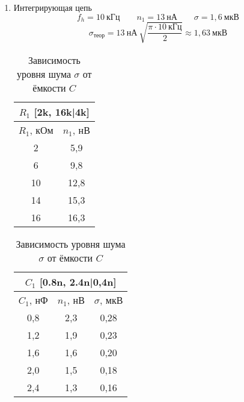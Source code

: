 \begin{enumerate}
	\item Интегрирующая цепь
	\[
		f_h = 10 \ кГц \quad \quad n_1 = 13 \ нА \quad \quad \sigma = 1,6 \ мкВ
	\]
	\[
		\sigma_{теор} = 13 \ нА \ \sqrt{\frac{\pi \cdot 10 \ кГц}{2}} \approx 1,63 \ мкВ
	\]
	\begin{table}[!h]
		\begin{minipage}[h]{0.45\linewidth}
				\centering
				\begin{tabular}{|cc|}
					\hline
					\multicolumn{2}{|c|}{$ R_1 $ {[}2k, 16k|4k{]}} \\ \hline
					\multicolumn{1}{|c|}{$ R_1 $, кОм}    & $ n_1 $, нВ    \\ \hline
					\multicolumn{1}{|c|}{2}          & 5,9     \\ \hline
					\multicolumn{1}{|c|}{6}          & 9,8      \\ \hline
					\multicolumn{1}{|c|}{10}         & 12,8     \\ \hline
					\multicolumn{1}{|c|}{14}         & 15,3     \\ \hline
					\multicolumn{1}{|c|}{16}         & 16,3     \\ \hline
				\end{tabular}
				\caption{Зависимость шумового напряжения $ n_1 $ от $ R_1 $}
				\label{tab:table_7}
		\end{minipage}
		\hfill
		\begin{minipage}[h]{0.45\linewidth}
			\centering
			\begin{tabular}{|ccc|}
				\hline
				\multicolumn{3}{|c|}{$ C_1 $   {[}0.8n, 2.4n|0,4n{]}}                          \\ \hline
				\multicolumn{1}{|c|}{$ C_1 $, нФ} & \multicolumn{1}{c|}{$ n_1 $, нВ} & $ \sigma $, мкВ \\ \hline
				\multicolumn{1}{|c|}{0,8}      & \multicolumn{1}{c|}{2,3}      & 0,28       \\ \hline
				\multicolumn{1}{|c|}{1,2}      & \multicolumn{1}{c|}{1,9}      & 0,23       \\ \hline
				\multicolumn{1}{|c|}{1,6}      & \multicolumn{1}{c|}{1,6}      & 0,20       \\ \hline
				\multicolumn{1}{|c|}{2,0}      & \multicolumn{1}{c|}{1,5}      & 0,18       \\ \hline
				\multicolumn{1}{|c|}{2,4}      & \multicolumn{1}{c|}{1,3}      & 0,16       \\ \hline
			\end{tabular}
			\caption{Зависимость уровня шума $ \sigma $  от ёмкости $ C $}
			\label{tab:table_8}
		\end{minipage}
	\end{table}


\end{enumerate}
